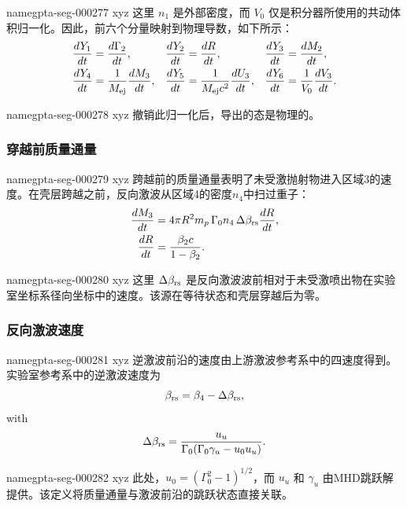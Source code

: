 \documentclass[twocolumn]{aastex702}
\makeatletter
\providecommand{\gptareaderanchor}[1]{\pdfdest name{#1} xyz}%
\providecommand{\gptareaderanchor}[1]{\special{pdf:dest (#1) [ @thispage /XYZ @xpos @ypos null ]}}%
\makeatother
\begin{document}
\gptareaderanchor{gpta-seg-000277}%
这里 \(n_1\) 是外部密度，而 \(V_0\) 仅是积分器所使用的共动体积归一化。因此，前六个分量映射到物理导数，如下所示：
\begin{equation}
\begin{aligned}
\frac{dY_1}{dt}&=\frac{d\Gamma_2}{dt},&
\frac{dY_2}{dt}&=\frac{dR}{dt},&
\frac{dY_3}{dt}&=\frac{dM_2}{dt},\\
\frac{dY_4}{dt}&=\frac{1}{M_{\rm ej}}\frac{dM_3}{dt},&
\frac{dY_5}{dt}&=\frac{1}{M_{\rm ej}c^2}\frac{dU_3}{dt},&
\frac{dY_6}{dt}&=\frac{1}{V_0}\frac{dV_3}{dt}.
\end{aligned}
\end{equation}

\gptareaderanchor{gpta-seg-000278}%
撤销此归一化后，导出的态是物理的。

\subsubsection{穿越前质量通量}


\gptareaderanchor{gpta-seg-000279}%
跨越前的质量通量表明了未受激抛射物进入区域3的速度。在壳层跨越之前，反向激波从区域4的密度\(n_4\)中扫过重子：
\begin{equation}
\begin{aligned}
\frac{dM_3}{dt}&=
4\pi R^2m_p\,\Gamma_0 n_4\,\Delta\beta_{\rm rs}
\frac{dR}{dt},\\
\frac{dR}{dt}&=\frac{\beta_2c}{1-\beta_2}.
\end{aligned}
\end{equation}

\gptareaderanchor{gpta-seg-000280}%
这里 \(\Delta\beta_{\rm rs}\) 是反向激波波前相对于未受激喷出物在实验室坐标系径向坐标中的速度。该源在等待状态和壳层穿越后为零。

\subsubsection{反向激波速度}


\gptareaderanchor{gpta-seg-000281}%
逆激波前沿的速度由上游激波参考系中的四速度得到。实验室参考系中的逆激波速度为
\begin{equation}
\beta_{\rm rs}=\beta_4-\Delta\beta_{\rm rs},
\end{equation}
with
\begin{equation}
\Delta\beta_{\rm rs}
=\frac{u_u}
{\Gamma_0(\Gamma_0\gamma_u-u_0u_u)}.
\end{equation}

\gptareaderanchor{gpta-seg-000282}%
此处，\(u_0 = (\Gamma_0^2 - 1)^{1/2}\)，而 \(u_u\) 和 \(\gamma_u\) 由MHD跳跃解提供。该定义将质量通量与激波前沿的跳跃状态直接关联。
\end{document}
